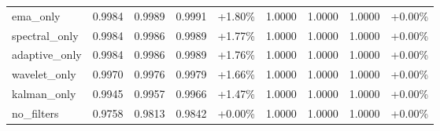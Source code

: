 \begin{table}[htbp]
\begin{adjustbox}{max width=\textwidth}
\begin{tabular}{l cccc cccc}
ema\_only & 0.9984 & 0.9989 & 0.9991 & +1.80\% & 1.0000 & 1.0000 & 1.0000 & +0.00\% \\
spectral\_only & 0.9984 & 0.9986 & 0.9989 & +1.77\% & 1.0000 & 1.0000 & 1.0000 & +0.00\% \\
adaptive\_only & 0.9984 & 0.9986 & 0.9989 & +1.76\% & 1.0000 & 1.0000 & 1.0000 & +0.00\% \\
wavelet\_only & 0.9970 & 0.9976 & 0.9979 & +1.66\% & 1.0000 & 1.0000 & 1.0000 & +0.00\% \\
kalman\_only & 0.9945 & 0.9957 & 0.9966 & +1.47\% & 1.0000 & 1.0000 & 1.0000 & +0.00\% \\
no\_filters & 0.9758 & 0.9813 & 0.9842 & +0.00\% & 1.0000 & 1.0000 & 1.0000 & +0.00\% \\
\bottomrule
\end{tabular}
\end{adjustbox}
\end{table}